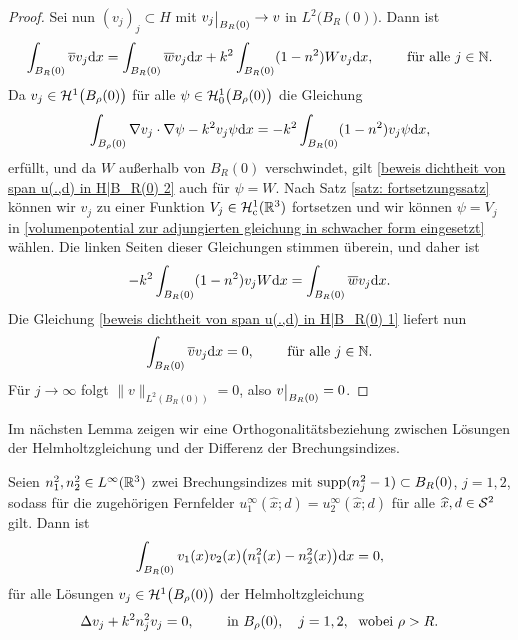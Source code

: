 \begin{proof}
	Sei nun \((v_j)_j\subset H\) mit \(v_j\restrict{B_R(0)}\to v\) in \(L^2\big(B_R(0)\big)\). Dann ist
	\begin{equation}
		\label{beweis dichtheit von span u(.,d) in H|B_R(0) 1}
		\int_{B_R(0)}\overline{v}v_j\mathrm{d}x=\int_{B_R(0)}\overline{w}v_j\mathrm{d}x+k^2\int_{B_R(0)}(1-n^2)Wv_j\mathrm{d}x,\qquad\text{ für alle }j\in\mathbb{N}.
	\end{equation}
	Da \(v_j\in\mathcal{H}^1\big(B_\rho(0)\big)\) für alle \(\psi\in\mathcal{H}_0^1\big(B_\rho(0)\big)\) die Gleichung
	\begin{equation}
		\label{beweis dichtheit von span u(.,d) in H|B_R(0) 2}
		\int_{B_\rho(0)}\nabla v_j\cdot\nabla\psi-k^2v_j\psi\mathrm{d}x=-k^2\int_{B_R(0)}(1-n^2)v_j\psi\mathrm{d}x,
	\end{equation}
	erfüllt, und da \(W\) außerhalb von \(B_R(0)\) verschwindet, gilt \eqref{beweis dichtheit von span u(.,d) in H|B_R(0) 2} auch für \(\psi=W\). Nach Satz \ref{satz: fortsetzungssatz} können wir \(v_j\) zu einer Funktion \(V_j\in\mathcal{H}_{\mathrm{c}}^1(\mathbb{R}^3)\) fortsetzen und wir können \(\psi=V_j\) in \eqref{volumenpotential zur adjungierten gleichung in schwacher form eingesetzt} wählen. Die linken Seiten dieser Gleichungen stimmen überein, und daher ist
	\begin{equation*}
		-k^2\int_{B_R(0)}(1-n^2)v_jW\mathrm{d}x=\int_{B_R(0)}\overline{w}v_j\mathrm{d}x.
	\end{equation*}
	Die Gleichung \eqref{beweis dichtheit von span u(.,d) in H|B_R(0) 1} liefert nun
	\begin{equation*}
		\int_{B_R(0)}\overline{v}v_j\mathrm{d}x=0,\qquad\text{ für alle }j\in\mathbb{N}.
	\end{equation*}
	Für \(j\to\infty\) folgt \(\|v\|_{L^2(B_R(0))}=0\), also \(v\restrict{B_R(0)}=0\).
\end{proof}
Im nächsten Lemma zeigen wir eine Orthogonalitätsbeziehung zwischen Lösungen der Helmholtzgleichung und der Differenz der Brechungsindizes.
\begin{lem}\label{lem: orthogonalitätsbeziehung zwischen brechungsindizes}
	Seien \(n_1^2,n_2^2\in L^\infty(\mathbb{R}^3)\) zwei Brechungsindizes mit \(\operatorname{supp}(n_j^2-1)\subset B_R(0)\), \(j=1,2\), sodass für die zugehörigen Fernfelder \(u_1^\infty(\widehat{x};d)=u_2^\infty(\widehat{x};d)\) für alle \(\widehat{x},d\in\mathcal{S}^2\) gilt. Dann ist
	\begin{equation}
		\label{orthogonalitätsbeziehung zwischen brechungsindizes}
		\int_{B_R(0)}v_1(x)v_2(x)\big(n_1^2(x)-n_2^2(x)\big)\mathrm{d}x=0,
	\end{equation}
	für alle Lösungen \(v_j\in\mathcal{H}^1\big(B_\rho(0)\big)\) der Helmholtzgleichung
	\begin{equation*}
		\Delta v_j+k^2n_j^2v_j=0,\qquad\text{ in }B_\rho(0),\quad j=1,2,\;\text{ wobei }\rho>R.
	\end{equation*}
\end{lem}
